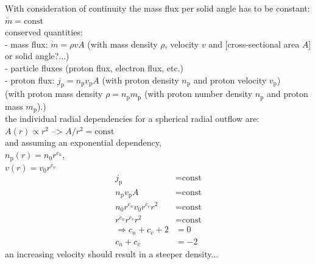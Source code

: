 

With consideration of continuity the mass flux per solid angle has to be constant: $\dot{m} = \text{const}$\\
conserved quantities:\\
- mass flux: $\dot{m} = \rho v A$ (with mass density $\rho$, velocity $v$ and [cross-sectional area $A$] or solid angle?...)\\
- particle fluxes (proton flux, electron flux, etc.)\\
	- proton flux: $j_\text{p} = n_\text{p} v_\text{p} A$ (with proton density $n_\text{p}$ and proton velocity $v_\text{p}$)\\

(with proton mass density $\rho = n_\text{p} m_\text{p}$ (with proton number density $n_\text{p}$ and proton mass $m_\text{p}$).)\\

the individual radial dependencies for a spherical radial outflow are:\\
$A(r) \propto r^2$ --> $A/r^2 = \text{const}$\\
and assuming an exponential dependency,\\
$n_{\text{p}}(r) = n_0 r^{c_n}$,\\
$v(r) = v_0 r^{c_v}$\\
\begin{align}
	j_\text{p} &= \text{const}\\
	n_\text{p} v_\text{p} A &= \text{const}\\
	n_0 r^{c_n} v_0 r^{c_v} r^2 &= \text{const}\\
	r^{c_n} r^{c_v} r^2 &= \text{const}\\
	\Rightarrow c_n + c_v + 2 &= 0\\
	c_n + c_v &= -2
\end{align}
an increasing velocity should result in a steeper density...\\

